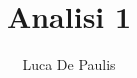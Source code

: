\documentclass[italian,oneside,headinclude,10pt]{scrbook}
\begin{document}
\author{Luca De Paulis}
\title{Analisi 1}
\maketitle

\tableofcontents













\end{document}
